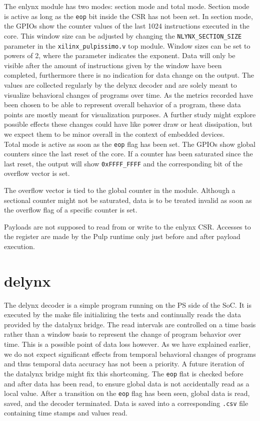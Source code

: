 \documentclass[../bachelor_paper.tex]{subfiles}
\begin{document}
The enlynx module has two modes: section mode and total mode. Section mode is active as long as the \texttt{eop} bit inside the \ac{CSR} has not been set. In section mode, the GPIOs show the counter values of the last 1024 instructions executed in the core. This window size can be adjusted by changing the \texttt{NLYNX\_SECTION\_SIZE} parameter in the \texttt{xilinx\_pulpissimo.v} top module. Window sizes can be set to powers of 2, where the parameter indicates the exponent. Data will only be visible after the amount of instructions given by the window have been completed, furthermore there is no indication for data change on the output. The values are collected regularly by the delynx decoder and are solely meant to visualize behavioral changes of programs over time. As the metrics recorded have been chosen to be able to represent overall behavior of a program, these data points are mostly meant for visualization purposes. A further study might explore possible effects these changes could have like power draw or heat dissipation, but we expect them to be minor overall in the context of embedded devices.\\
Total mode is active as soon as the \texttt{eop} flag has been set. The GPIOs show global counters since the last reset of the core. If a counter has been saturated since the last reset, the output will show \texttt{0xFFFF\_FFFF} and the corresponding bit of the overflow vector is set.

The overflow vector is tied to the global counter in the module. Although a sectional counter might not be saturated, data is to be treated invalid as soon as the overflow flag of a specific counter is set.

Payloads are not supposed to read from or write to the enlynx \ac{CSR}. Accesses to the register are made by the Pulp runtime only just before and after payload execution.

\section{delynx}
The delynx decoder is a simple program running on the \ac{PS} side of the \ac{SoC}. It is executed by the make file initializing the tests and continually reads the data provided by the datalynx bridge. The read intervals are controlled on a time basis rather than a window basis to represent the change of program behavior over time. This is a possible point of data loss however. As we have explained earlier, we do not expect significant effects from temporal behavioral changes of programs and thus temporal data accuracy has not been a priority. A future iteration of the datalynx bridge might fix this shortcoming. The \texttt{eop} flat is checked before and after data has been read, to ensure global data is not accidentally read as a local value. After a transition on the \texttt{eop} flag has been seen, global data is read, saved, and the decoder terminated. Data is saved into a corresponding \texttt{.csv} file containing time stamps and values read.
\end{document}
